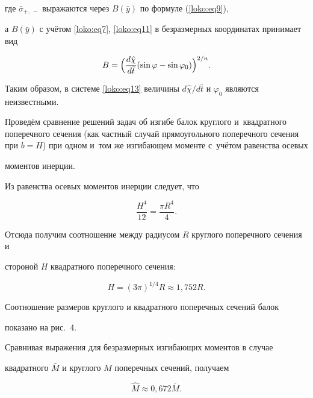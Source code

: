 где $\bar {\sigma }_{+,\,-} $ выражаются через $B(\bar {y})$ по формуле (\ref{loko:eq9}),

а $B(\bar {y})$ с учётом \eqref{loko:eq7}, \eqref{loko:eq11} в безразмерных координатах принимает вид

\begin{equation}

\label{loko:eq14}

B=\Bigl( \frac{d\hat {\chi }}{d\bar {t}} (\sin \varphi -\sin \varphi_0) \Bigr)^{{2}/{n}}.

\end{equation}

Таким образом, в системе \eqref{loko:eq13} величины ${d\hat{\chi }}/{d\bar {t}}$ и $\varphi _0$ являются неизвестными.



\smallskip




Проведём сравнение решений задач об изгибе балок круглого и~квадратного поперечного сечения (как частный случай прямоугольного поперечного сечения при $b=H$) при одном и~том же изгибающем моменте с~учётом равенства осевых

моментов инерции.

Из равенства осевых моментов инерции следует, что

\[

\frac{H^4}{12}=\frac{\pi R^4}{4}.

\]

Отсюда получим соотношение между радиусом $R$ круглого поперечного сечения и

стороной $H$ квадратного поперечного сечения:

\[

H= (3\pi)^{1/4} R \approx 1,752 R.

\]

Соотношение размеров круглого и квадратного поперечных сечений балок

показано на рис.~4.

Сравнивая выражения для безразмерных изгибающих моментов в случае

квадратного $\bar{M}$ и круглого $\hat {M}$ поперечных сечений, получаем

\[

\hat {M}\approx 0,672  \bar {M}.

\]



